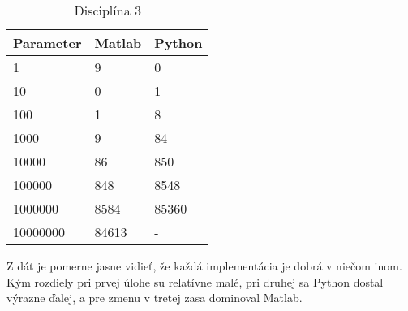 \documentclass[12pt,a4paper]{article}
\begin{document}
\begin{longtable}[c]{@{}lll@{}}
\caption{Disciplína 3}
\label{tab:dis3}\\
\toprule
Parameter  & Matlab & Python \\* \midrule
1        & 9      & 0      \\
10       & 0      & 1      \\
100      & 1      & 8      \\
1000     & 9      & 84     \\
10000    & 86     & 850    \\
100000   & 848    & 8548   \\
1000000  & 8584   & 85360  \\
10000000 & 84613  & -      \\* \bottomrule
\end{longtable}

Z dát je pomerne jasne vidieť, že každá implementácia je dobrá v niečom inom.
Kým rozdiely pri prvej úlohe su relatívne malé, pri druhej sa Python dostal výrazne ďalej, a pre zmenu v tretej zasa dominoval Matlab.
\end{document}
